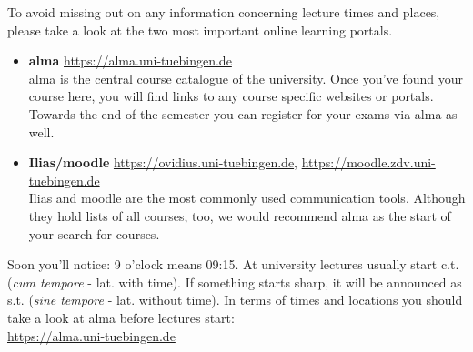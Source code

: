 
To avoid missing out on any information concerning lecture times and places, please take a look at the two most important online learning portals.
\begin{itemize}
	\item \textbf{alma} \url{https://alma.uni-tuebingen.de} \\
	alma is the central course catalogue of the university. Once you've found your course here, you will find links to any course specific websites or portals.
	Towards the end of the semester you can register for your exams via alma as well.
	\item \textbf{Ilias/moodle} \url{https://ovidius.uni-tuebingen.de}, \url{https://moodle.zdv.uni-tuebingen.de} \\
	Ilias and moodle are the most commonly used communication tools. Although they hold lists of all courses, too, we would recommend alma as the start of your search for courses.
\end{itemize}

Soon you'll notice: 9 o'clock means 09:15. At university lectures usually start c.t. (\textit{cum
tempore} - lat. with time). If something starts \glqq sharp\grqq, it will be announced as s.t. (\textit{sine tempore} - lat. without
time). In terms of times and locations you should take a look at alma before lectures start:\\
\url{https://alma.uni-tuebingen.de} \\ \\
